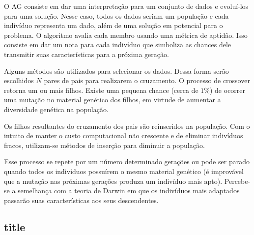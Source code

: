 \documentclass[]{article}
\begin{document}
	O AG consiste em dar uma interpretação para um conjunto de dados e evoluí-los para uma solução. Nesse caso, todos os dados seriam um população e cada indivíduo representa um dado, além de uma solução em potencial para o problema. O algoritmo avalia cada membro usando uma métrica de aptidão. Isso consiste em dar um nota para cada indivíduo que simboliza as chances dele transmitir suas características para a próxima geração.
	
	Alguns métodos são utilizados para selecionar os dados. Dessa forma serão escolhidos $N$ pares de pais para realizarem o cruzamento. O processo de crossover retorna um ou mais filhos. Existe uma pequena chance (cerca de $1\%$) de ocorrer uma mutação no material genético dos filhos, em virtude de aumentar a diversidade genética na população.
	
	Os filhos resultantes do cruzamento dos pais são reinseridos na população. Com o intuito de manter o custo computacional não crescente e de eliminar indivíduos fracos, utilizam-se métodos de inserção para diminuir a população.
	
	Esse processo se repete por um número determinado gerações ou pode ser parado quando todos os indivíduos possuírem o mesmo material genético (é improvável que a mutação nas próximas gerações produza um indivíduo mais apto). 
 	Percebe-se a semelhança com a teoria de Darwin em que os indivíduos mais adaptados passarão suas características aos seus descendentes.
	
	
\subsection{title}

\newpage


\end{document}
